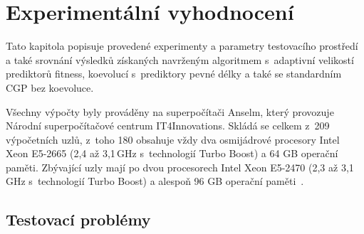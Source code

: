 %

\chapter{Experimentální vyhodnocení}
\label{chExperiments}

Tato kapitola popisuje provedené experimenty a parametry testovacího prostředí a také srovnání výsledků získaných navrženým algoritmem s~adaptivní velikostí prediktorů fitness, koevolucí s~prediktory pevné délky a také se standardním CGP bez koevoluce.

Všechny výpočty byly prováděny na superpočítači Anselm, který provozuje Národní superpočítačové centrum IT4Innovations. Skládá se celkem z~209 výpočetních uzlů, z~toho 180 obsahuje vždy dva osmijádrové procesory Intel Xeon E5-2665 (2,4 až 3,1\,GHz s~technologií Turbo Boost) a 64 GB operační paměti. Zbývající uzly mají po dvou procesorech Intel Xeon E5-2470 (2,3 až 3,1\,GHz s~technologií Turbo Boost) a alespoň 96 GB operační paměti~\cite{AnselmSpecs}.


\section{Testovací problémy}
\label{secExpProblems}

